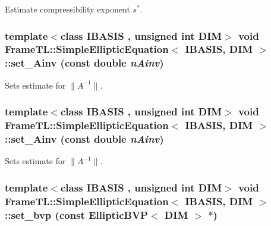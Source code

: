 Estimate compressibility exponent $s^\ast$. \hypertarget{classFrameTL_1_1SimpleEllipticEquation_dace879d1d00d7e327a108c68451c714}{
\subsubsection[{set\_\-Ainv}]{\setlength{\rightskip}{0pt plus 5cm}template$<$class IBASIS , unsigned int DIM$>$ void {\bf FrameTL::SimpleEllipticEquation}$<$ IBASIS, DIM $>$::set\_\-Ainv (const double {\em nAinv})}}
\label{classFrameTL_1_1SimpleEllipticEquation_dace879d1d00d7e327a108c68451c714}


Sets estimate for $\|A^{-1}\|$. \hypertarget{classFrameTL_1_1SimpleEllipticEquation_dace879d1d00d7e327a108c68451c714}{
\subsubsection[{set\_\-Ainv}]{\setlength{\rightskip}{0pt plus 5cm}template$<$class IBASIS , unsigned int DIM$>$ void {\bf FrameTL::SimpleEllipticEquation}$<$ IBASIS, DIM $>$::set\_\-Ainv (const double {\em nAinv})}}
\label{classFrameTL_1_1SimpleEllipticEquation_dace879d1d00d7e327a108c68451c714}


Sets estimate for $\|A^{-1}\|$. \hypertarget{classFrameTL_1_1SimpleEllipticEquation_56298192b4c795a3e2923d3c9175116e}{
\subsubsection[{set\_\-bvp}]{\setlength{\rightskip}{0pt plus 5cm}template$<$class IBASIS , unsigned int DIM$>$ void {\bf FrameTL::SimpleEllipticEquation}$<$ IBASIS, DIM $>$::set\_\-bvp (const EllipticBVP$<$ DIM $>$ $\ast$)}}
\label{classFrameTL_1_1SimpleEllipticEquation_56298192b4c795a3e2923d3c9175116e}


